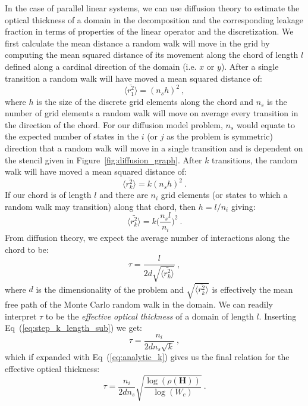 \documentclass[preprint,11pt]{elsarticle}
\newcommand{\ve}[1]{\ensuremath{\mathbf{#1}}}
\begin{document}
In the case of parallel linear systems, we can use diffusion theory to
estimate the optical thickness of a domain in the decomposition and the
corresponding leakage fraction in terms of properties of the linear operator
and the discretization. We first calculate the mean distance a random walk
will move in the grid by computing the mean squared distance of its movement
along the chord of length $l$ defined along a cardinal direction of the domain
(i.e. $x$ or $y$). After a single transition a random walk will have moved a
mean squared distance of:
\begin{equation}
  \langle \bar{r_1^2} \rangle = (n_s h)^2\:,
  \label{eq:step_1_length}
\end{equation}
where $h$ is the size of the discrete grid elements along the chord and $n_s$
is the number of grid elements a random walk will move on average every
transition in the direction of the chord. For our diffusion model problem,
$n_s$ would equate to the expected number of states in the $i$ (or $j$ as the
problem is symmetric) direction that a random walk will move in a single
transition and is dependent on the stencil given in
Figure~\ref{fig:diffusion_graph}. After $k$ transitions, the random walk will
have moved a mean squared distance of:
\begin{equation}
  \langle \bar{r_k^2} \rangle = k (n_s h)^2\:.
  \label{eq:step_k_length}
\end{equation}
If our chord is of length $l$ and there are $n_i$ grid elements (or
states to which a random walk may transition) along that chord, then $h =
l / n_i$ giving:
\begin{equation}
  \langle \bar{r_k^2} \rangle = k \Bigg(\frac{n_s l}{n_i}\Bigg)^2\:.
  \label{eq:step_k_length_sub}
\end{equation}
From diffusion theory, we expect the average number of interactions
along the chord to be:
\begin{equation}
  \tau = \frac{l}{2 d \sqrt{\langle \bar{r_k^2} \rangle}}\:,
  \label{eq:optical_thickness_1}
\end{equation}
where $d$ is the dimensionality of the problem and $\sqrt{\langle
  \bar{r_k^2} \rangle}$ is effectively the mean free path of the Monte
Carlo random walk in the domain. We can readily interpret $\tau$ to be the
\textit{effective optical thickness} of a domain of length
$l$. Inserting Eq~(\ref{eq:step_k_length_sub}) we get:
\begin{equation}
  \tau = \frac{n_i}{2 d n_s \sqrt{k}}\:,
  \label{eq:optical_thickness_2}
\end{equation}
which if expanded with Eq~(\ref{eq:analytic_k}) gives us the final
relation for the effective optical thickness:
\begin{equation}
  \tau = \frac{n_i}{2 d n_s}
  \sqrt{\frac{\log(\rho(\ve{H}))}{\log(W_c)}}\:.
  \label{eq:optical_thickness_3}
\end{equation}
\end{document}
